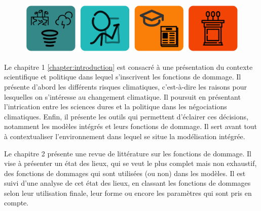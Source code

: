 \begin{figure}
    \centering
    \includegraphics[width=\textwidth]{illustrations/intro.png}
    \label{fig:enter-label}
\end{figure}



Le  chapitre 1 \cref{chapter:introduction} est consacré à une présentation du contexte scientifique et politique dans lequel s'inscrivent les fonctions de dommage. Il présente d'abord les différents risques climatiques, c'est-à-dire les raisons pour lesquelles on s'intéresse au changement climatique. Il poursuit en présentant l'intrication entre les sciences dures et la politique dans les négociations climatiques. Enfin, il présente les outils qui permettent d'éclairer ces décisions, notamment les modèles intégrés et leurs fonctions de dommage. Il sert avant tout à contextualiser l'environnement dans lequel se situe la modélisation intégrée. 

Le chapitre 2 présente une revue de littérature sur les fonctions de dommage. Il vise à présenter un état des lieux, qui se veut le plus complet mais non exhaustif, des fonctions de dommages qui sont utilisées (ou non) dans les modèles. Il est suivi d'une analyse de cet état des lieux, en classant les fonctions de dommages selon leur utilisation finale, leur forme ou encore les paramètres qui sont pris en compte. 

